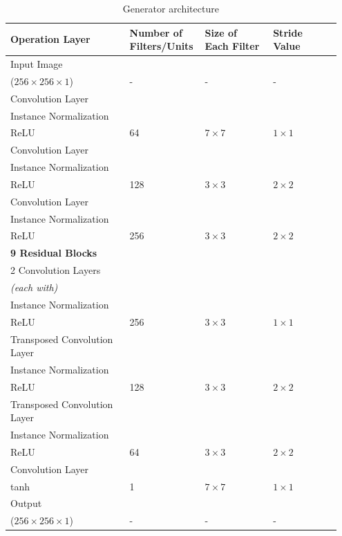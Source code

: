 \begin{table}[H]
    \centering

    \begin{tabular}{P{0.35\linewidth} P{0.20\linewidth} P{0.20\linewidth} P{0.20\linewidth}} 
        \toprule
        \textbf{Operation Layer} & \textbf{Number of Filters/Units} & \textbf{Size of Each Filter} & \textbf{Stride Value}\\
        \toprule
        \toprule
        Input Image \\($256 \times 256 \times 1$) & - & - & - \\
        \midrule
        Convolution Layer\\Instance Normalization\\ReLU & 64 & $7 \times 7$ & $1 \times 1$\\
        \midrule
        Convolution Layer\\Instance Normalization\\ReLU & 128 & $3 \times 3$ & $2 \times 2$\\
        \midrule
        Convolution Layer\\Instance Normalization\\ReLU & 256 & $3 \times 3$ & $2 \times 2$\\
        \midrule
        \textbf{9 Residual Blocks}\\
	  2 Convolution Layers\\ \textit{(each with)}\\Instance Normalization\\ReLU & 256 & $3 \times 3$ & $1 \times 1$\\
        \midrule
        Transposed Convolution Layer\\Instance Normalization\\ReLU & 128 & $3 \times 3$ & $2 \times 2$\\
        \midrule
        Transposed Convolution Layer\\Instance Normalization\\ReLU & 64 & $3 \times 3$ & $2 \times 2$\\
        \midrule
         Convolution Layer\\tanh & 1 & $7 \times 7$ & $1 \times 1$\\
        \midrule
        \midrule
        Output  \\($256 \times 256 \times 1$) & - & - & -\\
        \bottomrule
    \end{tabular}
    \caption[Generator architecture]{Generator architecture}
    \label{table:GeneratorArchitecture}
\end{table}



